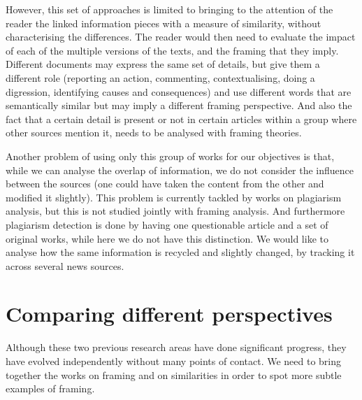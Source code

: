 However, this set of approaches is limited to bringing to the attention of the reader the linked information pieces with a measure of similarity, without characterising the differences.
The reader would then need to evaluate the impact of each of the multiple versions of the texts, and the framing that they imply. 
Different documents may express the same set of details, but give them a different role (reporting an action, commenting, contextualising, doing a digression, identifying causes and consequences) and use different words that are semantically similar but may imply a different framing perspective.
And also the fact that a certain detail is present or not in certain articles within a group where other sources mention it, needs to be analysed with framing theories.


Another problem of using only this group of works for our objectives is that, while we can analyse the overlap of information, we do not consider the influence between the sources (one could have taken the content from the other and modified it slightly).
This problem is currently tackled by works on plagiarism analysis, but this is not studied jointly with framing analysis.
And furthermore plagiarism detection is done by having one questionable article and a set of original works, while here we do not have this distinction.
We would like to analyse how the same information is recycled and slightly changed, by tracking it across several news sources.




\section{Comparing different perspectives}
\label{sec:lit_gap}
Although these two previous research areas have done significant progress, they have evolved independently without many points of contact.
We need to bring together the works on framing and on similarities in order to spot more subtle examples of framing.

